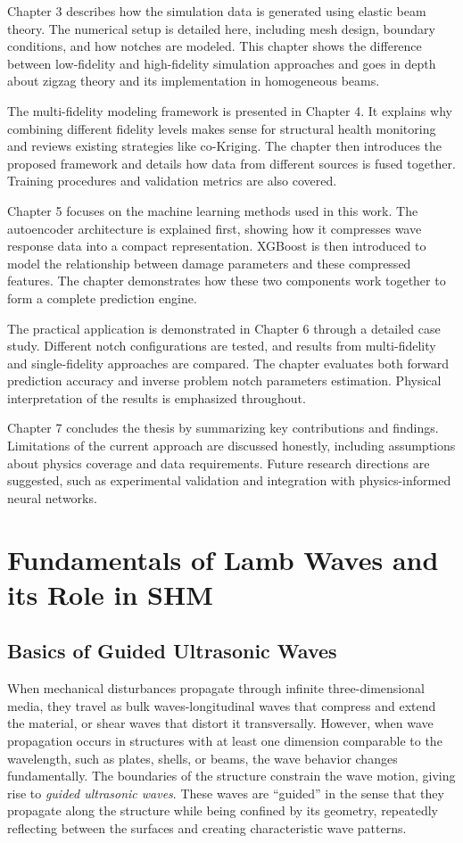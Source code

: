 \documentclass[12pt,a4paper]{report}
\begin{document}
Chapter 3 describes how the simulation data is generated using elastic beam theory. The numerical setup is detailed here, including mesh design, boundary conditions, and how notches are modeled. This chapter shows the difference between low-fidelity and high-fidelity simulation approaches and goes in depth about zigzag theory and its implementation in homogeneous beams.

The multi-fidelity modeling framework is presented in Chapter 4. It explains why combining different fidelity levels makes sense for structural health monitoring and reviews existing strategies like co-Kriging. The chapter then introduces the proposed framework and details how data from different sources is fused together. Training procedures and validation metrics are also covered.

Chapter 5 focuses on the machine learning methods used in this work. The autoencoder architecture is explained first, showing how it compresses wave response data into a compact representation. XGBoost is then introduced to model the relationship between damage parameters and these compressed features. The chapter demonstrates how these two components work together to form a complete prediction engine.

The practical application is demonstrated in Chapter 6 through a detailed case study. Different notch configurations are tested, and results from multi-fidelity and single-fidelity approaches are compared. The chapter evaluates both forward prediction accuracy and inverse problem notch parameters estimation. Physical interpretation of the results is emphasized throughout.

Chapter 7 concludes the thesis by summarizing key contributions and findings. Limitations of the current approach are discussed honestly, including assumptions about physics coverage and data requirements. Future research directions are suggested, such as experimental validation and integration with physics-informed neural networks.

\chapter{Fundamentals of Lamb Waves and its Role in SHM}

\section{Basics of Guided Ultrasonic Waves}

When mechanical disturbances propagate through infinite three-dimensional media, they travel as bulk waves-longitudinal waves that compress and extend the material, or shear waves that distort it transversally. However, when wave propagation occurs in structures with at least one dimension comparable to the wavelength, such as plates, shells, or beams, the wave behavior changes fundamentally. The boundaries of the structure constrain the wave motion, giving rise to \textit{guided ultrasonic waves}. These waves are ``guided'' in the sense that they propagate along the structure while being confined by its geometry, repeatedly reflecting between the surfaces and creating characteristic wave patterns.
\end{document}
